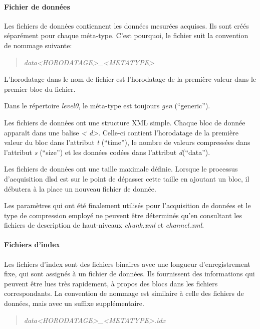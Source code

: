 \documentclass[a4paper,12pt,BCOR6mm,bibtotoc,idxtotoc]{scrbook}
\begin{document}
\paragraph{Fichier de donn\'ees}
Les fichiers de donn\'ees contiennent les donn\'ees mesur\'ees acquises. Ils
sont cr\'e\'es s\'epar\'ement pour chaque m\'eta-type. C'est pourquoi,
le fichier suit la convention de nommage suivante:

\begin{quote}
  \textit{data\textless HORODATAGE\textgreater\_\textless METATYPE\textgreater}
\end{quote}

L'horodatage dans le nom de fichier est l'horodatage de la premi\`ere
valeur dans le premier bloc du fichier.

Dans le r\'epertoire \textit{level0}, le m\'eta-type est toujours
\textit{gen} (``generic'').

Les fichiers de donn\'ees ont une structure XML simple.  Chaque bloc
de donn\'ee appara\^it dans une balise \textit{\textless
  d\textgreater}.  Celle-ci contient l'horodatage de la premi\`ere
valeur du bloc dans l'attribut \textit{t} (``time''), le nombre de
valeurs compress\'ees dans l'attribut \textit{s} (``size'') et les
donn\'ees cod\'ees dans l'attribut \textit{d}(``data'').

Les fichiers de donn\'ees ont une taille maximale d\'efinie.  Lorsque
le processus d'acquisition dlsd est sur le point de d\'epasser cette
taille en ajoutant un bloc, il d\'ebutera \`a la place un nouveau
fichier de donn\'ee.

Les param\`etres qui ont \'et\'e finalement utilis\'es pour
l'acquisition de donn\'ees et le type de compression employ\'e ne
peuvent \^etre d\'etermin\'es qu'en consultant les fichiers de
description de haut-niveaux \textit{chunk.xml} et
\textit{channel.xml}.

\paragraph{Fichiers d'index}
Les fichiers d'index sont des fichiers binaires avec une longueur d'enregistrement fixe, qui sont assign\'es \`a un fichier de donn\'ees.
Ils fournissent des informations qui peuvent \^etre lues tr\`es rapidement,
\`a propos des blocs dans les fichiers correspondants.
La convention de nommage est similaire \`a celle des fichiers de donn\'ees, mais
avec un suffixe suppl\'ementaire.

\begin{quote}
  \textit{data\textless HORODATAGE\textgreater\_\textless METATYPE\textgreater.idx}
\end{quote}
\end{document}
